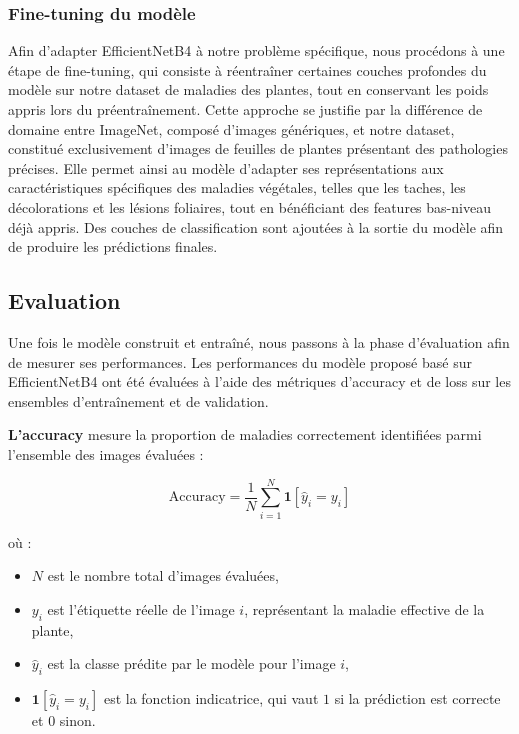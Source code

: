 \subsubsection{Fine-tuning du modèle}
Afin d'adapter EfficientNetB4 à notre problème spécifique, nous procédons 
à une étape de fine-tuning, qui consiste à réentraîner certaines couches 
profondes du modèle sur notre dataset de maladies des plantes, tout en 
conservant les poids appris lors du préentraînement. Cette approche se 
justifie par la différence de domaine entre ImageNet, composé d'images 
génériques, et notre dataset, constitué exclusivement d'images de feuilles 
de plantes présentant des pathologies précises. Elle permet ainsi au modèle 
d'adapter ses représentations aux caractéristiques spécifiques des maladies 
végétales, telles que les taches, les décolorations et les lésions foliaires, 
tout en bénéficiant des features bas-niveau déjà appris. Des couches de 
classification sont ajoutées à la sortie du modèle afin de produire les 
prédictions finales.
\subsection{Evaluation}
Une fois le modèle construit et entraîné, nous passons à la phase d’évaluation afin de mesurer ses performances.
Les performances du modèle proposé basé sur EfficientNetB4 ont été évaluées à l’aide des métriques d’accuracy et de loss sur les ensembles d’entraînement et de validation.

\textbf{L'accuracy} mesure la proportion de maladies correctement 
identifiées parmi l'ensemble des images évaluées :

\begin{equation*}
    \text{Accuracy} = \frac{1}{N}\sum_{i=1}^{N} 
    \mathbf{1}[\hat{y}_i = y_i]
\end{equation*}

où :
\begin{itemize}
    \item $N$ est le nombre total d'images évaluées,
    \item $y_i$ est l'étiquette réelle de l'image $i$, représentant 
    la maladie effective de la plante,
    \item $\hat{y}_i$ est la classe prédite par le modèle pour 
    l'image $i$,
    \item $\mathbf{1}[\hat{y}_i = y_i]$ est la fonction indicatrice, 
    qui vaut $1$ si la prédiction est correcte et $0$ sinon.
\end{itemize}

